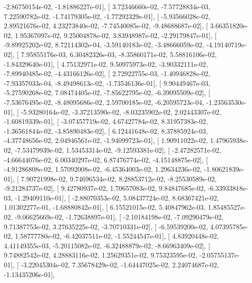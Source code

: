 \documentclass{article}
\begin{document}
         -2.86750154e-02,  -1.81886227e-01],
       [  3.72346660e-02,  -7.57728834e-03,   7.22590782e-02,
         -1.74179305e-02,  -1.77292329e-01],
       [ -5.93566028e-02,   2.89521676e-02,   4.23273840e-02,
         -7.74540085e-02,  -9.48688687e-02],
       [  3.66351820e-02,   1.95367097e-02,   9.25004878e-02,
          3.83948987e-02,  -2.29179847e-01],
       [ -9.89925202e-02,   8.72114302e-04,  -3.59140183e-02,
         -3.48666059e-02,  -4.19140719e-02],
       [  7.95855176e-03,   6.30482326e-03,  -8.35860171e-02,
          5.58816106e-02,  -1.84329640e-01],
       [  4.75132971e-02,   9.50975973e-02,  -3.90332111e-02,
         -7.89940485e-02,  -4.43166126e-02],
       [  2.72922755e-03,  -1.40946828e-02,  -7.93357033e-04,
         -8.49498613e-02,  -1.73546136e-01],
       [  9.90449467e-03,  -5.27590268e-02,   7.08474405e-02,
         -7.85622795e-02,  -6.39095509e-02],
       [ -7.53676495e-02,  -8.48095686e-02,   2.59700185e-02,
         -6.20595723e-04,  -1.23563530e-01],
       [ -5.93280164e-02,  -3.37213590e-02,  -8.03235902e-02,
          2.02443307e-02,  -1.60819339e-01],
       [ -3.07457719e-02,   4.67427784e-02,   8.31957383e-02,
         -1.36561844e-02,  -3.85890483e-02],
       [  6.12441648e-02,   8.37885924e-03,  -4.37748656e-02,
          2.04946561e-02,  -1.94099723e-01],
       [  1.90911022e-02,   1.47965938e-02,  -7.53479939e-02,
          1.53453314e-02,  -9.12593381e-02],
       [ -2.47282571e-02,  -4.66644076e-02,   6.00340297e-02,
          6.87476774e-02,  -4.15148875e-02],
       [ -4.91286808e-02,   1.57092008e-02,  -6.45364003e-02,
          1.29634236e-02,  -1.80621839e-01],
       [  7.90721998e-02,   9.74696534e-02,   8.28853712e-02,
         -8.25530589e-02,  -9.21284737e-02],
       [  9.42780937e-02,   1.70657083e-02,   9.84847685e-02,
         -6.33933818e-03,  -1.29409110e-01],
       [ -2.88070353e-02,   5.08437724e-02,   8.68367421e-02,
          1.01302277e-01,  -1.68880842e-01],
       [  6.15521015e-02,   5.40847962e-03,   1.85485527e-02,
         -9.06625669e-02,  -1.72638897e-01],
       [ -2.10184198e-02,  -7.09290479e-02,   9.71387753e-02,
          3.27635225e-02,  -3.70710331e-02],
       [ -6.59539200e-02,   4.07395785e-02,   1.58777780e-02,
         -6.42037511e-02,  -1.55244547e-01],
       [  4.83920448e-02,   4.41149355e-03,  -5.20115082e-02,
         -6.32488879e-02,  -8.66963409e-02],
       [  9.74882542e-02,   4.28883116e-02,   1.25629351e-02,
          9.75323595e-02,  -2.05755137e-01],
       [ -3.22045304e-02,   7.35678429e-02,  -1.64447025e-02,
          2.24074687e-02,  -1.13435206e-01],
\end{document}
